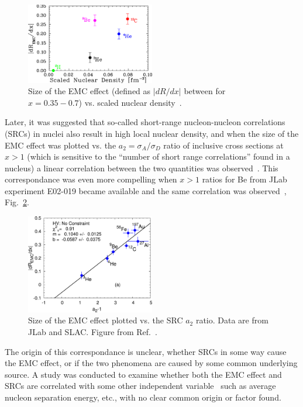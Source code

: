 \begin{figure}[htb]
  \includegraphics[width=0.5\textwidth]{plots/e03103_slopes.pdf}
  \caption{Size of the EMC effect (defined as $|dR/dx|$ between for $x=0.35-0.7$) vs. scaled nuclear
    density~\cite{Seely:2009gt}.}
  \label{fig:emc_jlab_hallc}
\end{figure}

Later, it was suggested that so-called short-range nucleon-nucleon correlations (SRCs) in nuclei also result
in high local nuclear density, and when the size of the EMC effect was plotted vs. the
$a_2=\sigma_A/\sigma_D$ ratio of
inclusive cross sections at $x>1$ (which is sensitive to the ``number of short range correlations''
found in a nucleus) a linear correlation between the two quantities was observed~\cite{Weinstein:2010rt}.
This correspondance was even more compelling when $x>1$ ratios for Be from JLab experiment E02-019 became
available and the same correlation was observed~\cite{Hen:2012fm}, Fig.~\ref{fig:emc_src_bff}.

\begin{figure}[htb]
  \includegraphics[width=0.5\textwidth]{plots/plotfit_all_norescaling_nocm_rean_final.pdf}
  \caption{Size of the EMC effect plotted vs. the SRC $a_2$ ratio. Data are from JLab and SLAC. Figure
  from Ref.~\cite{Arrington:2012ax}.}
  \label{fig:emc_src_bff}
\end{figure}

The origin of this correspondance is unclear, whether SRCs in some way cause the EMC effect, or if the two
phenomena are caused by some common underlying source.  A study was conducted to examine whether
both the EMC effect and SRCs are correlated with some other independent variable~\cite{Arrington:2012ax} such
as average nucleon separation energy, etc., with no clear common origin or factor found.
